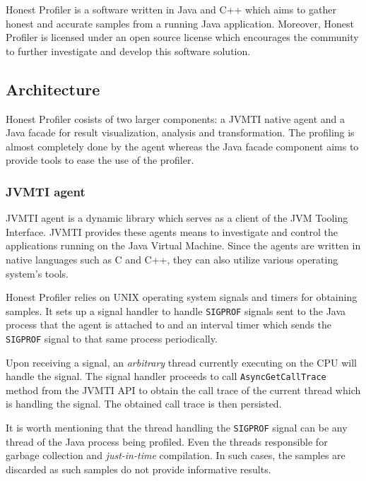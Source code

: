 \documentclass[..thesis.tex]{subfiles}
\begin{document}

Honest Profiler \cite{hon_prof} is a software written in Java and C++ which aims to gather honest and accurate samples from a running Java application. Moreover, Honest Profiler is licensed under an open source license which encourages the community to further investigate and develop this software solution.

\subsection{Architecture}
Honest Profiler cosists of two larger components: a JVMTI native agent and a Java facade for result visualization, analysis and transformation. The profiling is almost completely done by the agent whereas the Java facade component aims to provide tools to ease the use of the profiler.

\subsubsection{JVMTI agent}
JVMTI agent is a dynamic library which serves as a client of the JVM Tooling Interface. \cite{jvmtm} JVMTI provides these agents means to investigate and control the applications running on the Java Virtual Machine. Since the agents are written in native languages such as C and C++, they can also utilize various operating system's tools.

Honest Profiler relies on UNIX operating system signals and timers for obtaining samples.
It sets up a signal handler to handle \texttt{SIGPROF} signals sent to the Java process that the agent is attached to and an interval timer which sends the \texttt{SIGPROF} signal to that same process periodically. 

Upon receiving a signal, an \textit{arbitrary} thread currently executing on the CPU will handle the signal. The signal handler proceeds to call \texttt{AsyncGetCallTrace} method from the JVMTI API to obtain the call trace of the current thread which is handling the signal. The obtained call trace is then persisted.

It is worth mentioning that the thread handling the \texttt{SIGPROF} signal can be any thread of the Java process being profiled. Even the threads responsible for garbage collection and \textit{just-in-time} compilation. In such cases, the samples are discarded as such samples do not provide informative results.
\end{document}
